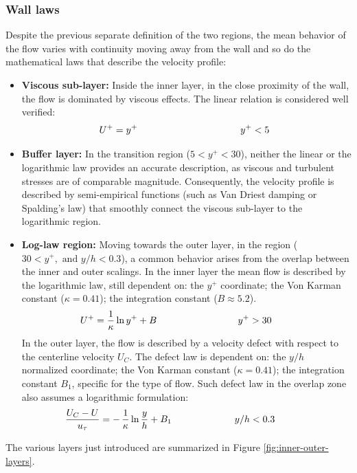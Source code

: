 \documentclass[12pt, a4paper, twoside, openright]{book}
\begin{document}
\subsubsection{Wall laws}
\label{sec:wall-laws}
Despite the previous separate definition of the two regions, the mean behavior of the flow varies with continuity moving away from the wall and so do the mathematical laws that describe the velocity profile:
\begin{itemize}
	\item \textbf{Viscous sub-layer:} Inside the inner layer, in the close proximity of the wall, the flow is dominated by viscous effects. The linear relation is considered well verified:
	      \begin{equation}
		      \makebox[5.0cm][c]{$\displaystyle U^+ = y^+$}
		      \makebox[5.0cm][c]{$\displaystyle y^+ < 5$}
	      \end{equation}
	\item \textbf{Buffer layer:} In the transition region ($5 < y^+ < 30$), neither the linear or the logarithmic law provides an accurate description, as viscous and turbulent stresses are of comparable magnitude. Consequently, the velocity profile is described by semi-empirical functions (such as Van Driest damping or Spalding's law) that smoothly connect the viscous sub-layer to the logarithmic region.
	\item \textbf{Log-law region:} Moving towards the outer layer, in the region ($30 < y^+, \text{ and } y/h < 0.3$), a common behavior arises from the overlap between the inner and outer scalings. In the inner layer	the mean flow is described by the logarithmic law, still dependent on: the $y^+$ coordinate; the Von Karman constant ($\kappa = 0.41$); the integration constant ($B \approx 5.2$).
	      \begin{equation}
		      \makebox[5.0cm][c]{$\displaystyle U^+ = \frac{1}{\kappa} \, \text{ln} \, y^+ + B$}
		      \makebox[5.0cm][c]{$\displaystyle y^+ > 30$}
	      \end{equation}
	      In the outer layer, the flow is described by a velocity defect with respect to the centerline velocity $U_C$. The defect law is dependent on: the $y/h$ normalized coordinate; the Von Karman constant ($\kappa = 0.41$); the integration constant $B_1$, specific for the type of flow. Such defect law in the overlap zone also assumes a logarithmic formulation:
	      \begin{equation}
		      \makebox[5.0cm][c]{$\displaystyle \frac{U_C - U}{u_\tau} = - \, \frac{1}{\kappa} \, \text{ln} \, \frac{y}{h} + B_1$}
		      \makebox[5.0cm][c]{$\displaystyle y/h < 0.3$}
	      \end{equation}
\end{itemize}
The various layers just introduced are summarized in Figure \ref{fig:inner-outer-layers}.
\end{document}
